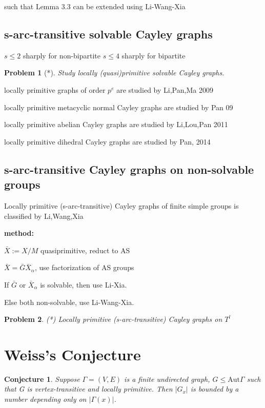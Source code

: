 \documentclass[a4paper,11pt,openany]{book}
\newtheorem{conjecture}{Conjecture}[section]
\newtheorem{problem}{Problem}[section]
\def\Aut{\mathrm{Aut}}
\begin{document}
such that Lemma 3.3 can be extended using Li-Wang-Xia


\subsection{s-arc-transitive solvable Cayley graphs}
$s\leq 2$ sharply for non-bipartite
$s\leq 4$ sharply for bipartite
\begin{problem}[*]
	Study locally (quasi)primitive solvable Cayley graphs.
\end{problem}

locally primitive graphs of order $p^e$ are studied by Li,Pan,Ma 2009

locally primitive metacyclic normal Cayley graphs are studied by Pan 09

locally primitive abelian Cayley graphs are studied by Li,Lou,Pan 2011

locally primitive dihedral Cayley graphs are studied by Pan, 2014


\subsection{s-arc-transitive Cayley graphs on non-solvable groups}
Locally primitive (s-arc-transitive) Cayley graphs of finite simple groups is classified by Li,Wang,Xia

\textbf{method:}

$\bar{X}:=X/M$ quasiprimitive, reduct to AS

$\bar{X}=\bar{G} \bar{X}_\alpha$, use factorization of AS groups

If $\bar{G}$ or $\bar{X}_\alpha$ is solvable, then use Li-Xia. 

Else both non-solvable, use Li-Wang-Xia. 

\begin{problem}(*)
	Locally primitive (s-arc-transitive) Cayley graphs on $T^l$
\end{problem}

\section{Weiss's Conjecture}

\begin{conjecture}
	Suppose $\Gamma = (V, E)$ is a finite undirected graph, $G\leq \Aut\Gamma$ such that G
is vertex-transitive and locally primitive. Then $|G_x|$ is bounded by a number depending only on $|\Gamma(x)|$.
\end{conjecture}
\end{document}

